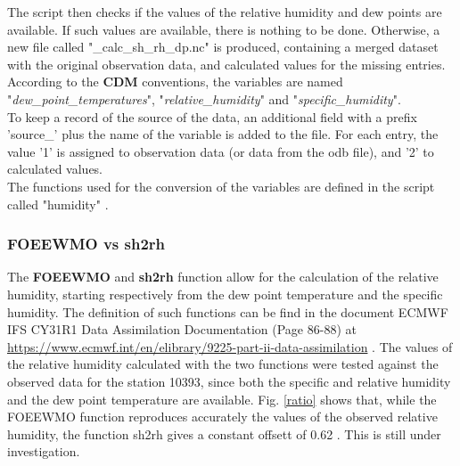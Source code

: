 \documentclass[a4paper,11pt]{article}
\begin{document}
The script then checks if the values of the relative humidity and dew points are available. If such values are available, there is nothing to be done. Otherwise, a new file called "\_calc\_sh\_rh\_dp.nc" is produced, containing a merged dataset with the original observation data, and calculated values for the missing entries. According to the \textbf{CDM} conventions, the variables are named "\textit{dew\_point\_temperatures}", "\textit{relative\_humidity}" and "\textit{specific\_humidity}". 
\\
To keep a record of the source of the data, an additional field with a prefix 'source\_' plus the name of the variable is added to the file. For each entry, the value '1' is assigned to observation data (or data from the odb file), and '2' to calculated values. 
\\
The functions used for the conversion of the variables are defined in the script called "humidity" . 



\subsubsection{FOEEWMO vs sh2rh} \label{comparison}
The \textbf{FOEEWMO} and \textbf{sh2rh} function allow for the calculation of the relative humidity, starting respectively from the dew point temperature and the specific humidity. The definition of such functions can be find in the document ECMWF IFS CY31R1 Data Assimilation Documentation (Page 86-88) at \url{https://www.ecmwf.int/en/elibrary/9225-part-ii-data-assimilation} .
The values of the relative humidity calculated with the two functions were tested against the observed data for the station 10393, since both the specific and relative humidity and the dew point temperature are available. Fig. \ref{ratio} shows that, while the FOEEWMO function reproduces accurately the values of the observed relative humidity, the function sh2rh gives a constant offsett of 0.62 . This is still under investigation.
\end{document}
